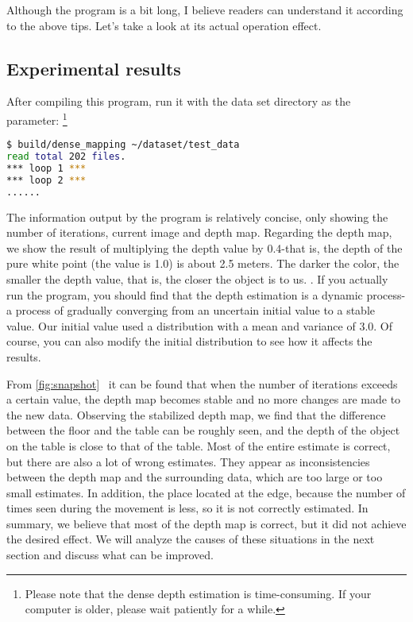 Although the program is a bit long, I believe readers can understand it according to the above tips. Let's take a look at its actual operation effect.

\subsection*{Experimental results}
After compiling this program, run it with the data set directory as the parameter: \footnote{Please note that the dense depth estimation is time-consuming. If your computer is older, please wait patiently for a while. }
\begin{lstlisting}[language=sh,caption=Terminal ouptut:]
$ build/dense_mapping ~/dataset/test_data 
read total 202 files.
*** loop 1 ***
*** loop 2 ***
......
\end{lstlisting}

The information output by the program is relatively concise, only showing the number of iterations, current image and depth map. Regarding the depth map, we show the result of multiplying the depth value by 0.4-that is, the depth of the pure white point (the value is 1.0) is about 2.5 meters. The darker the color, the smaller the depth value, that is, the closer the object is to us. . If you actually run the program, you should find that the depth estimation is a dynamic process-a process of gradually converging from an uncertain initial value to a stable value. Our initial value used a distribution with a mean and variance of 3.0. Of course, you can also modify the initial distribution to see how it affects the results.

From \autoref{fig:snapshot}~ it can be found that when the number of iterations exceeds a certain value, the depth map becomes stable and no more changes are made to the new data. Observing the stabilized depth map, we find that the difference between the floor and the table can be roughly seen, and the depth of the object on the table is close to that of the table. Most of the entire estimate is correct, but there are also a lot of wrong estimates. They appear as inconsistencies between the depth map and the surrounding data, which are too large or too small estimates. In addition, the place located at the edge, because the number of times seen during the movement is less, so it is not correctly estimated. In summary, we believe that most of the depth map is correct, but it did not achieve the desired effect. We will analyze the causes of these situations in the next section and discuss what can be improved.


